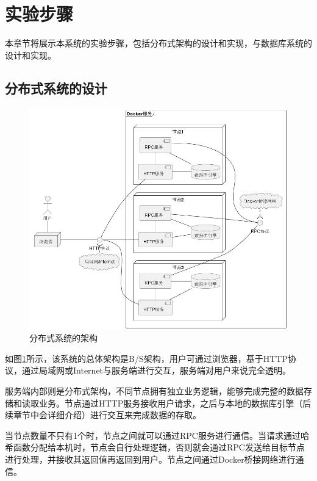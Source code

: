 \section{实验步骤}

本章节将展示本系统的实验步骤，包括分布式架构的设计和实现，与数据库系统的设计和实现。

\subsection{分布式系统的设计}

\begin{figure}[H]
    \centering
    \includegraphics[width=\linewidth]{examples/分布式系统架构.png}
    \caption{分布式系统的架构}
    \label{fig:dist-arch}
\end{figure}

如图\ref{fig:dist-arch}所示，该系统的总体架构是B/S架构，用户可通过浏览器，基于HTTP协议，通过局域网或Internet与服务端进行交互，服务端对用户来说完全透明。

服务端内部则是分布式架构，不同节点拥有独立业务逻辑，能够完成完整的数据存储和读取业务。节点通过HTTP服务接收用户请求，之后与本地的数据库引擎（后续章节中会详细介绍）进行交互来完成数据的存取。

当节点数量不只有1个时，节点之间就可以通过RPC服务进行通信。当请求通过哈希函数分配给本机时，节点会自行处理逻辑，否则就会通过RPC发送给目标节点进行处理，并接收其返回值再返回到用户。节点之间通过Docker桥接网络进行通信。

